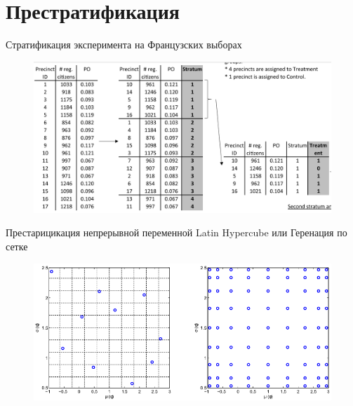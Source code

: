 \section{Престратификация}

    
    


\begin{frame}{Стратификация эксперимента на Французских выборах \parencite{pons2018will}}
\begin{figure}
    \centering
    \includegraphics[width=\textwidth]{Images/startification_pons.png}
\end{figure}
\end{frame}

\begin{frame}{Престарицикация непрерывной переменной}
Latin Hypercube или Геренация по сетке

\begin{figure}
    \centering
    \includegraphics[width=\textwidth]{Images/Latin_hypercube.png}
    \label{fig:my_label}
\end{figure}
\end{frame}